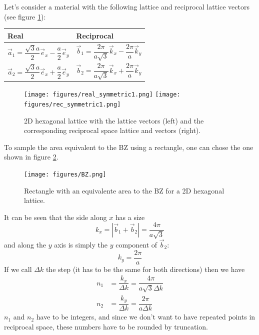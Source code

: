 \documentclass[a4paper,12pt]{report}
\begin{document}
 Let's consider a material with the following lattice and reciprocal lattice vectors
 (see figure \ref{fig:2D hexagonal}):
\medskip

\begin{tabular}{l|l}
\centering
Real & Reciprocal \\[0.1cm]\hline
$\vec{a}_1 = \dfrac{\sqrt{3}a}{2}\vec{e}_x - \dfrac{a}{2}\vec{e}_y$ &
$\vec{b}_1 = \dfrac{2\pi}{a\sqrt{3}}\vec{k}_x-\dfrac{2\pi}{a}\vec{k}_y $\\[0.2cm]
$\vec{a}_2 = \dfrac{\sqrt{3}a}{2}\vec{e}_x + \dfrac{a}{2}\vec{e}_y$ &
$\vec{b}_2 = \dfrac{2\pi}{a\sqrt{3}}\vec{k}_x + \dfrac{2\pi}{a}\vec{k}_y $\\[0.2cm]
\hline
\end{tabular}
\begin{figure}[h]
 \centering
 \texttt{[image: figures/real\_symmetric1.png]}\hspace*{1.5cm}
 \texttt{[image: figures/rec\_symmetric1.png]}
 \caption{2D hexagonal lattice with the lattice vectors (left)
 and the corresponding reciprocal space lattice and vectors (right).}
 \label{fig:2D hexagonal}
\end{figure}

To sample the area equivalent to the BZ using a rectangle, one can chose the one shown
in figure \ref{fig:BZ_2D hexagonal}.

\begin{figure}[h]
 \centering
 \texttt{[image: figures/BZ.png]}
 \caption{Rectangle with an equivalente area to the BZ for a 2D hexagonal lattice.}
 \label{fig:BZ_2D hexagonal}
\end{figure}

It can be seen that the side along $x$ has a size
\begin{equation}
 k_x = |\vec{b}_1 + \vec{b}_2| = \dfrac{4\pi}{a\sqrt{3}}
\end{equation}
and along the $y$ axis is simply the $y$ component of $\vec{b}_2$:
\begin{equation}
 k_y = \dfrac{2\pi}{a}
\end{equation}
If we call $\Delta k$ the step (it has to be the same for both directions)
then we have
\begin{align*}
 n_1 &= \dfrac{k_x}{\Delta k} = \dfrac{4\pi}{a\sqrt{3}\Delta k} \\
 n_2 &= \dfrac{k_y}{\Delta k} = \dfrac{2\pi}{a\Delta k}
\end{align*}
$n_1$ and $n_2$ have to be integers, and since we don't want to have
repeated points in reciprocal space, these numbers have to be rounded
by truncation.
\end{document}
